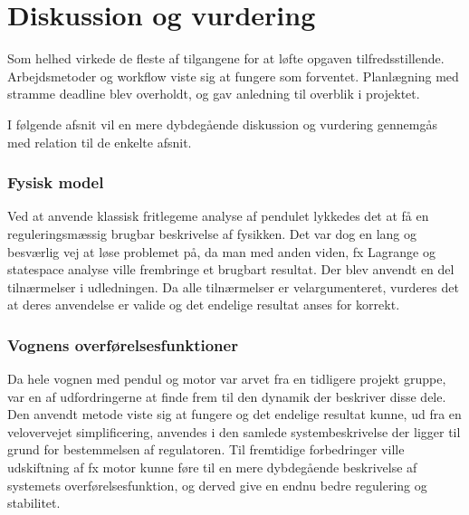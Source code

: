 \chapter{Diskussion og vurdering}\label{kap:diskussion}
Som helhed virkede de fleste af tilgangene for at løfte opgaven tilfredsstillende.
Arbejdsmetoder og workflow viste sig at fungere som forventet.
Planlægning med stramme deadline blev overholdt, og gav anledning til overblik i projektet.

I følgende afsnit vil en mere dybdegående diskussion og vurdering gennemgås med relation til de enkelte afsnit. 

\subsection{Fysisk model}
Ved at anvende klassisk fritlegeme analyse af pendulet lykkedes det at få en reguleringsmæssig brugbar beskrivelse af fysikken. 
Det var dog en lang og besværlig vej at løse problemet på, da man med anden viden, fx Lagrange og statespace analyse ville frembringe et brugbart resultat.
Der blev anvendt en del tilnærmelser i udledningen. 
Da alle tilnærmelser er velargumenteret, vurderes det at deres anvendelse er valide og det endelige resultat anses for korrekt.   

\subsection{Vognens overførelsesfunktioner}
Da hele vognen med pendul og motor var arvet fra en tidligere projekt gruppe, var en af udfordringerne at finde frem til den dynamik der beskriver disse dele.
Den anvendt metode viste sig at fungere og det endelige resultat kunne, ud fra en velovervejet simplificering, anvendes i den samlede systembeskrivelse der ligger til grund for bestemmelsen af regulatoren.
Til fremtidige forbedringer ville udskiftning af fx motor kunne føre til en mere dybdegående beskrivelse af systemets overførelsesfunktion, og derved give en endnu bedre regulering og stabilitet.

